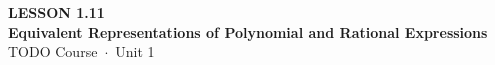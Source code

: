 \documentclass[aspectratio=169, 11pt]{beamer}
\begin{document}
{
\begin{frame}[plain]
  \vspace{2.8cm}\hspace{0.55cm}%
  \begin{minipage}{0.9\textwidth}
    {\color{goldacc}\bfseries\small LESSON 1.11}\\[0.5cm]
    {\color{white}\bfseries\LARGE Equivalent Representations of Polynomial and Rational Expressions}\\[1.2cm]
    {\color{skymid}\small TODO Course~$\cdot$~Unit 1}
  \end{minipage}
\end{frame}
}

\begin{frame}[t, plain]
\end{frame}
\end{document}
